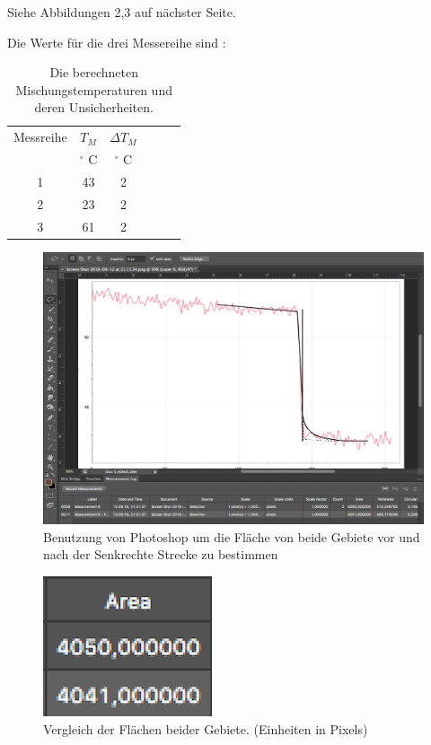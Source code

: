 \documentclass[11pt,a4paper]{article} %
\begin{document}
Siehe Abbildungen 2,3 auf n\"achster Seite.

Die Werte für die drei Messereihe sind :

\begin{table}[h]
	\centering
	\begin{tabular*}{0.99\textwidth}{@{\extracolsep{\fill}}cccccc}
		\toprule
		Messreihe & $T_M$ & $\Delta T_M$  \\
		& $^\circ$ C & $^\circ$ C \\
	    \bottomrule
		1 & 43 & 2  \\
		2 & 23 & 2 \\
		3 & 61 & 2 \\
		\bottomrule
	\end{tabular*}
	\caption{Die berechneten Mischungstemperaturen und deren   Unsicherheiten.}
	\label{tabelle}
\end{table}
\newpage
\begin{figure}[h]
\centering
\includegraphics[width=\linewidth]{Abb1}
\caption{Benutzung von Photoshop um die Fläche von beide Gebiete vor und nach der Senkrechte Strecke zu bestimmen}
\end{figure}

\begin{figure}[h]
\centering
\includegraphics{Abb2}
\caption{Vergleich der Flächen beider Gebiete. (Einheiten in Pixels)}
\end{figure}
\end{document}
